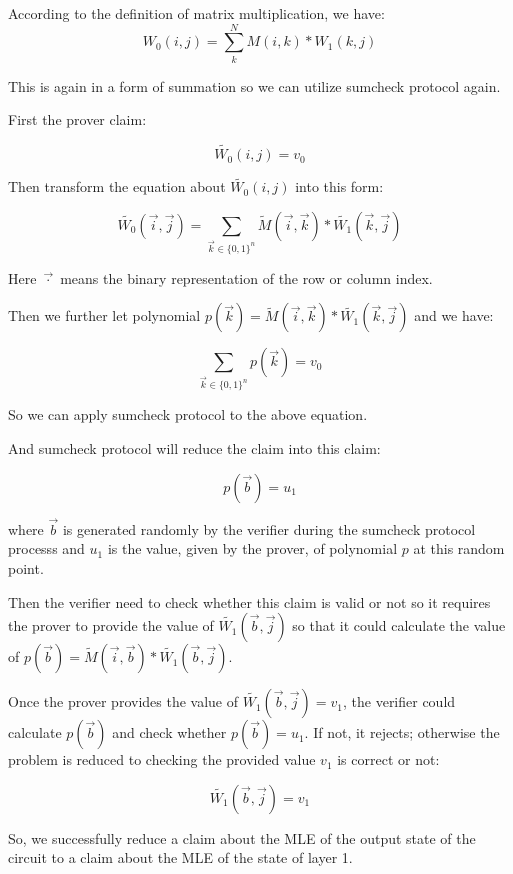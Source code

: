 \documentclass[12pt]{article}
\newenvironment{sol}[1][Solution]{\begin{trivlist}
\item[\hskip \labelsep {\bfseries #1:}]}{\end{trivlist}}
\begin{document}
\begin{sol}
    According to the definition of matrix multiplication, we have:
    $$
        W_0(i,j) =  \sum_k^{N} M(i, k) * W_1(k, j)
    $$

    This is again in a form of summation so we can utilize sumcheck protocol again.

    First the prover claim:

    $$
        \tilde{W_0}(i,j) = v_0
    $$

    Then transform the equation about $\tilde{W_0}(i,j)$ into this form:

    $$
        \tilde{W_0}(\vec{i}, \vec{j}) = \sum_{\vec{k} \in \{0,1\}^{n}} \tilde{M}(\vec{i}, \vec{k}) * \tilde{W_1}(\vec{k}, \vec{j})
    $$

    Here $\vec{\cdot}$ means the binary representation of the row or column index.

    Then we further let polynomial $p(\vec{k}) = \tilde{M}(\vec{i}, \vec{k}) * \tilde{W_1}(\vec{k}, \vec{j})$ and we have:

    $$
        \sum_{\vec{k} \in \{0,1\}^{n}} p(\vec{k}) = v_0
    $$

    So we can apply sumcheck protocol to the above equation.

    And sumcheck protocol will reduce the claim into this claim:

    $$
        p(\vec{b}) = u_1
    $$

    where $\vec{b}$ is generated randomly by the verifier during the sumcheck protocol processs and $u_1$ is the value, given by the prover, of polynomial $p$ at this random point.

    Then the verifier need to check whether this claim is valid or not so it requires the prover to provide the value of $\tilde{W_1}(\vec{b}, \vec{j})$ so that it could calculate the value of $p(\vec{b}) = \tilde{M}(\vec{i}, \vec{b}) * \tilde{W_1}(\vec{b}, \vec{j})$.

    Once the prover provides the value of $\tilde{W_1}(\vec{b}, \vec{j}) = v_1$, the verifier could calculate $p(\vec{b})$ and check whether $p(\vec{b}) = u_1$. If not, it rejects; otherwise the problem is reduced to checking the provided value $v_1$ is correct or not:

    $$
        \tilde{W_1}(\vec{b}, \vec{j}) = v_1
    $$

    So, we successfully reduce a claim about the MLE of the output state of the circuit to a claim about the MLE of the state of layer 1.


\end{sol}
\end{document}

